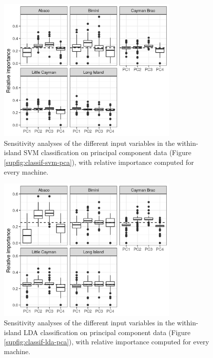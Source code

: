 \begin{figure}[H]
	\centering
	\includegraphics[width=0.8\textwidth]{suppfigures/importance_svm_pca.png}
	\caption{Sensitivity analyses of the different input variables in the within-island SVM classification on principal component data (Figure \ref{supfig:classif-svm-pca}), with relative importance computed for every machine.}
	\label{supfig:importance-svm-pca}
\end{figure}

\begin{figure}[H]
	\centering
	\includegraphics[width=0.8\textwidth]{suppfigures/importance_lda_pca.png}
	\caption{Sensitivity analyses of the different input variables in the within-island LDA classification on principal component data (Figure \ref{supfig:classif-lda-pca}), with relative importance computed for every machine.}
	\label{supfig:importance-lda-pca}
\end{figure}

